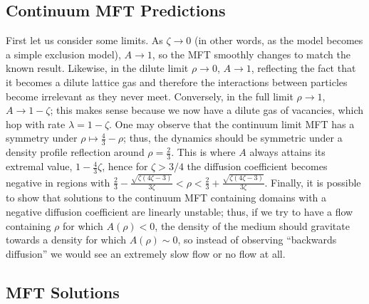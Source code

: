 \subsection{Continuum MFT Predictions} \label{sec:contMFTPred}
First let us consider some limits. As $\zeta \rightarrow 0$ (in other words, as the model becomes a simple exclusion model), $A \rightarrow 1$, so the MFT smoothly changes to match the known result. Likewise, in the
dilute limit $\rho \rightarrow 0$, $A \rightarrow 1$, reflecting the fact that it becomes a dilute lattice gas and therefore the interactions between particles become irrelevant as they never meet.
Conversely, in the full limit $\rho \rightarrow 1$, $A \rightarrow 1-\zeta$; this makes sense because we now have a dilute gas of vacancies, which hop with rate $\lambda=1-\zeta$.
One may observe that the continuum limit MFT has a symmetry under $\rho \mapsto \frac{4}{3} - \rho$; thus, the dynamics should be symmetric under a density profile reflection around $\rho = \frac{2}{3}$. This is where $A$ always
attains its extremal value, $ 1 - \frac{4}{3}\zeta$, hence for $\zeta>3/4$ the diffusion coefficient becomes negative in regions with
$\frac{2}{3} - \frac{\sqrt{\zeta\left(4\zeta - 3\right)}}{3\zeta} < \rho < \frac{2}{3} + \frac{\sqrt{\zeta\left(4\zeta - 3\right)}}{3\zeta}$.
Finally, it is possible to show that solutions to the continuum MFT containing domains with a negative diffusion coefficient are linearly unstable; thus, if we try to have a flow containing $\rho$ for which $A(\rho)<0$,
the density of the medium should gravitate towards a density for which $A(\rho)\sim 0$, so instead of observing ``backwards diffusion'' we would see an extremely slow flow or no flow at all.
\subsection{MFT Solutions}

